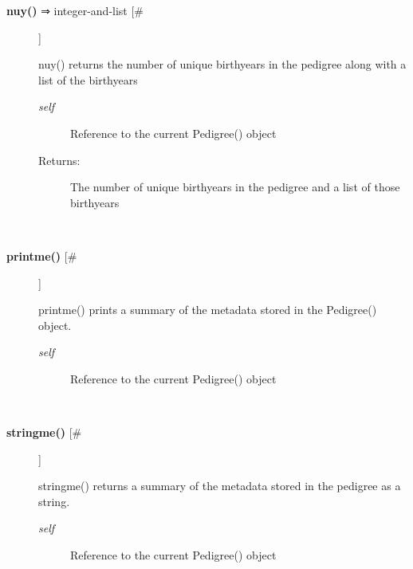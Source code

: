 \begin{description}
\item[\textbf{nuy()}
 ⇒ integer-and-list [\#]]

 nuy() returns the number of unique birthyears in the pedigree along with a list of the birthyears
\begin{description}
\item[\emph{self}
] Reference to the current Pedigree() object
\item[Returns:] The number of unique birthyears in the pedigree and a list of those birthyears

\end{description}
\\ 

\item[\textbf{printme()}
 [\#]]

 printme() prints a summary of the metadata stored in the Pedigree() object.
\begin{description}
\item[\emph{self}
] Reference to the current Pedigree() object

\end{description}
\\ 

\item[\textbf{stringme()}
 [\#]]

 stringme() returns a summary of the metadata stored in the pedigree as a string.
\begin{description}
\item[\emph{self}
] Reference to the current Pedigree() object

\end{description}
\\ 


\end{description}

